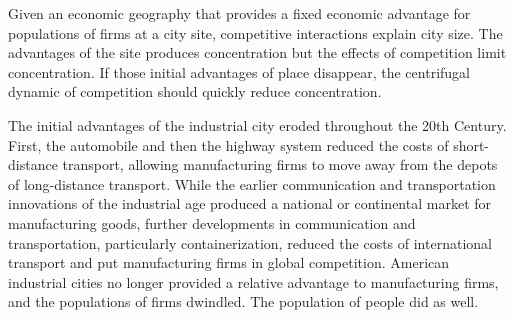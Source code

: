 Given an economic geography that provides a fixed economic advantage
for populations of firms at a city site, competitive interactions explain
city size. The advantages of the site produces concentration but the
effects of competition limit concentration. If those initial
advantages of place disappear, the centrifugal dynamic of competition
should quickly reduce concentration.

The initial advantages of the industrial city eroded throughout the
20th Century. First, the automobile and then the highway system
reduced the costs of short-distance transport, allowing manufacturing
firms to move away from the depots of long-distance transport. While
the earlier communication and transportation innovations of the
industrial age produced a national or continental market for
manufacturing goods, further developments in communication and
transportation, particularly containerization, reduced the costs of
international transport and put manufacturing firms in global
competition. American industrial cities no longer provided a relative
advantage to manufacturing firms, and the populations of firms
dwindled. The population of people did as well.






